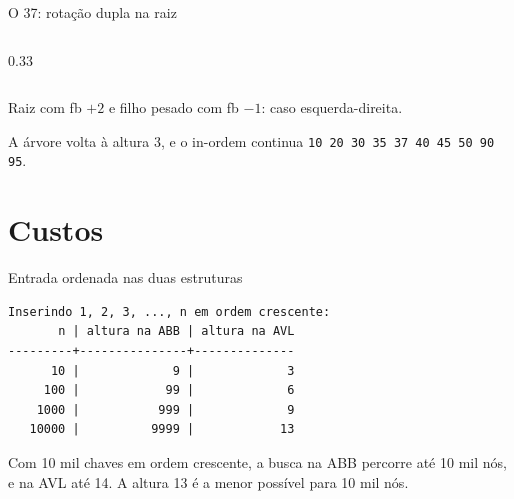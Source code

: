 \documentclass{beamer}
\begin{document}
\begin{frame}{O 37: rotação dupla na raiz}
\begin{columns}[t]
\begin{column}{0.33\textwidth}
      \vspace{0.1cm}
    \end{column}
  \end{columns}

  \vspace{0.2cm}
  \centering
  Raiz com fb $+2$ e filho pesado com fb $-1$: caso esquerda-direita.

  \vspace{0.1cm}
  {\scriptsize A árvore volta à altura 3, e o in-ordem continua
  \texttt{10 20 30 35 37 40 45 50 90 95}.}
\end{frame}

\section{Custos}

\begin{frame}[fragile]{Entrada ordenada nas duas estruturas}
\begin{verbatim}
Inserindo 1, 2, 3, ..., n em ordem crescente:
       n | altura na ABB | altura na AVL
---------+---------------+--------------
      10 |             9 |             3
     100 |            99 |             6
    1000 |           999 |             9
   10000 |          9999 |            13
\end{verbatim}

  \vspace{0.3cm}
  Com 10 mil chaves em ordem crescente, a busca na ABB percorre até 10 mil nós,
  e na AVL até 14. A altura 13 é a menor possível para 10 mil nós.
\end{frame}
\end{document}
